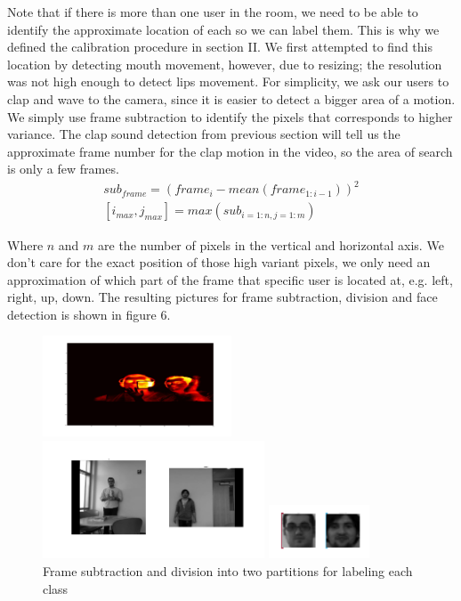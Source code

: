 \documentclass{article}
\begin{document}
Note that if there is more than one user in the room, we need to be able to identify the approximate location of each so we can label them. This is why we defined the calibration procedure in section II. We first attempted to find this location by detecting mouth movement, however, due to resizing; the resolution was not high enough to detect lips movement. For simplicity, we ask our users to clap and wave to the camera, since it is easier to detect a bigger area of a motion. We simply use frame subtraction to identify the pixels that corresponds to higher variance. The clap sound detection from previous section will tell us the approximate frame number for the clap motion in the video, so the area of search is only a few frames. 
\begin{gather*}
sub_{frame} = (frame_i - mean(frame_{1:i-1}))^2 \\ 
[i_{max}, j_{max}] = max(sub_{i=1:n,j=1:m})
\end{gather*}

Where $n$ and $m$ are the number of pixels in the vertical and horizontal axis. We don't care for the exact position of those high variant pixels, we only need an approximation of which part of the frame that specific user is located at, e.g. left, right, up, down. The resulting pictures for frame subtraction, division and face detection is shown in figure 6.
\begin{figure}[htb]
\begin{minipage}[b]{0.88\linewidth}
\centerline{\includegraphics[width=5.60cm]{clap_motion.jpg}}
\centerline{\includegraphics[width=6.60cm]{3d_audio_tracking_1.jpg}}
\centerline{\includegraphics[width=3.0cm]{3d_audio_tracking_2.jpg}}
\end{minipage}
\caption{Frame subtraction and division into two partitions for labeling each class}
\label{fig:res}
\end{figure}
\end{document}
